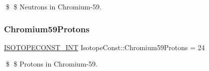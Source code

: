 \$ \$ Neutrons in Chromium-\/59. \mbox{\label{group___isotope_const-_chromium-_cr59_ga0f394ade0e65e1de67b260e9d0b38121}} 
\subsubsection{\texorpdfstring{Chromium59\+Protons}{Chromium59Protons}}
{\footnotesize\ttfamily \mbox{\hyperlink{group___isotope_const-_macros_ga5f18360b3e99483a35c32d789e62621c}{I\+S\+O\+T\+O\+P\+E\+C\+O\+N\+S\+T\+\_\+\+I\+NT}} Isotope\+Const\+::\+Chromium59\+Protons = 24}

\$ \$ Protons in Chromium-\/59. 